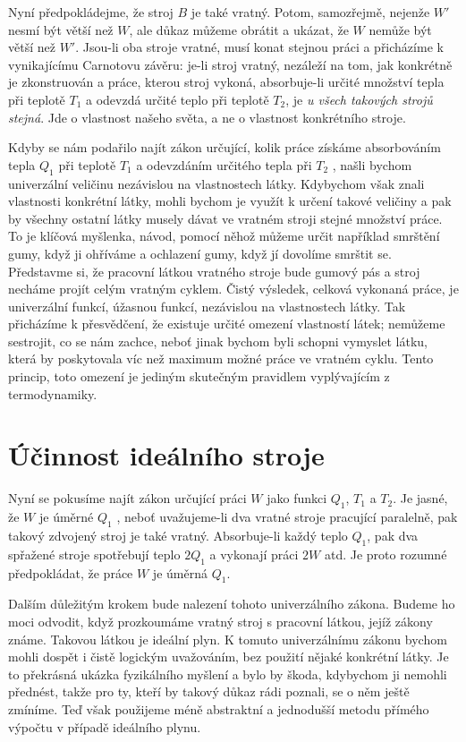    Nyní předpokládejme, že stroj \(B\) je také vratný. Potom, samozřejmě, nejenže \(W'\) nesmí být
    větší než \(W\), ale důkaz můžeme obrátit a ukázat, že \(W\) nemůže být větší než \(W'\).
    Jsou-li oba stroje vratné, musí konat stejnou práci a přicházíme k vynikajícímu Carnotovu
    závěru: je-li stroj vratný, nezáleží na tom, jak konkrétně je zkonstruován a práce, kterou stroj
    vykoná, absorbuje-li určité množství tepla při teplotě \(T_1\) a odevzdá určité teplo při
    teplotě \(T_2\), je \emph{u všech takových strojů stejná}. Jde o vlastnost našeho světa, a ne o
    vlastnost konkrétního stroje.

    Kdyby se nám podařilo najít zákon určující, kolik práce získáme absorbováním tepla \(Q_1\) při
    teplotě \(T_1\) a odevzdáním určitého tepla při \(T_2\) , našli bychom univerzální veličinu
    nezávislou na vlastnostech látky. Kdybychom však znali vlastnosti konkrétní látky, mohli bychom
    je využít k určení takové veličiny a pak by všechny ostatní látky musely dávat ve vratném stroji
    stejné množství práce. To je klíčová myšlenka, návod, pomocí něhož můžeme určit například
    smrštění gumy, když ji ohříváme a ochlazení gumy, když jí dovolíme smrštit se. Představme si, že
    pracovní látkou vratného stroje bude gumový pás a stroj necháme projít celým vratným cyklem.
    Čistý výsledek, celková vykonaná práce, je univerzální funkcí, úžasnou funkcí, nezávislou na
    vlastnostech látky. Tak přicházíme k přesvědčení, že existuje určité omezení vlastností látek;
    nemůžeme sestrojit, co se nám zachce, neboť jinak bychom byli schopni vymyslet látku, která by
    poskytovala víc než maximum možné práce ve vratném cyklu. Tento princip, toto omezení je jediným
    skutečným pravidlem vyplývajícím z termodynamiky.

  \section{Účinnost ideálního stroje}\label{fyz:IchapXLIVsecIV}
    Nyní se pokusíme najít zákon určující práci \(W\) jako funkci \(Q_1\), \(T_1\) a \(T_2\). Je
    jasné, že \(W\) je úměrné \(Q_1\) , neboť uvažujeme-li dva vratné stroje pracující paralelně,
    pak takový zdvojený stroj je také vratný. Absorbuje-li každý teplo \(Q_1\), pak dva spřažené
    stroje spotřebují teplo \(2Q_1\) a vykonají práci \(2W\) atd. Je proto rozumné předpokládat, že
    práce \(W\) je úměrná \(Q_1\).

    Dalším důležitým krokem bude nalezení tohoto univerzálního zákona. Budeme ho moci odvodit, když
    prozkoumáme vratný stroj s pracovní látkou, jejíž zákony známe. Takovou látkou je ideální plyn.
    K tomuto univerzálnímu zákonu bychom mohli dospět i čistě logickým uvažováním, bez použití
    nějaké konkrétní látky. Je to překrásná ukázka fyzikálního myšlení a bylo by škoda, kdybychom ji
    nemohli přednést, takže pro ty, kteří by takový důkaz rádi poznali, se o něm ještě zmíníme. Teď
    však použijeme méně abstraktní a jednodušší metodu přímého výpočtu v případě ideálního plynu.

